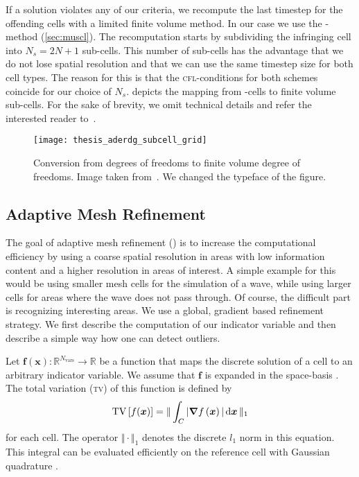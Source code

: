 If a solution violates any of our criteria, we recompute the last timestep for the offending cells with a limited finite volume method.
In our case we use the \muscl{}-method (\cref{sec:muscl}).
The recomputation starts by subdividing the infringing cell into $N_s = 2N + 1$ sub-cells.
This number of sub-cells has the advantage that we do not lose spatial resolution and that we can use the same timestep size for both cell types.
The reason for this is that the \textsc{cfl}-conditions for both schemes  coincide for our choice of $N_s$.
 depicts the mapping from \dg{}-cells to finite volume sub-cells.
For the sake of brevity, we omit technical details and refer the interested reader to~\cite{dumbser2016simple}.
\begin{figure}[htb]
  \centering
  \texttt{[image: thesis\_aderdg\_subcell\_grid]}
  \caption{\label{fig:limiting-subcells}Conversion from \dg{} degrees of freedoms to finite volume degree of freedoms. Image taken from~\cite{dumbser2018conformal}. We changed the typeface of the figure.}
\end{figure}

\subsection{Adaptive Mesh Refinement}\label{sec:amr}
The goal of adaptive mesh refinement (\amr{}) is to increase the computational efficiency by using a coarse spatial resolution in areas with low information content and a higher resolution in areas of interest.
A simple example for this would be using smaller mesh cells for the simulation of a wave, while using larger cells for areas where the wave does not pass through.
Of course, the difficult part is recognizing interesting areas.
We use a global, gradient based refinement strategy.
We first describe the computation of our indicator variable and then describe a simple way how one can detect outliers.

Let $\bm{f}(\bm{x}): \mathbb{R}^{N_\text{vars}} \to \mathbb{R}$ be a function that maps the discrete solution of a cell to an arbitrary indicator variable.
We assume that $\bm{f}$ is expanded in the space-basis .
The total variation (\textsc{tv}) of this function is defined by
\begin{equation}
  \label{eq:tv}
  \tv \left[ f(\bm{x}) \right] =
  \Vert
\intdcell{ \vert \gradient{f \left( \bm{x} \right)} \vert }
\Vert_1
\end{equation}
for each cell.
The operator $\Vert \cdot \Vert_1$ denotes the discrete $l_1$ norm in this equation.
This integral can be evaluated efficiently on the reference cell  with Gaussian quadrature .

